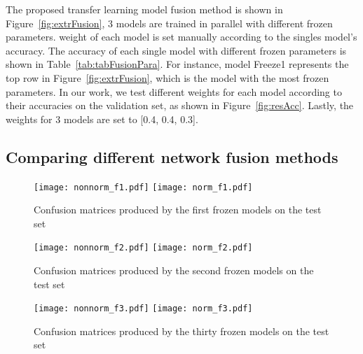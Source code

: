 The proposed transfer learning model 
fusion method is shown in 
Figure~\ref{fig:extrFusion}, 
3 models are trained in parallel with 
different frozen parameters. weight of each 
model is set manually according to the 
singles model’s accuracy. The accuracy of 
each single model with different frozen 
parameters is shown in 
Table~\ref{tab:tabFusionPara}. 
For instance, model Freeze1 represents the 
top row in 
Figure~\ref{fig:extrFusion}, 
which is the model with the most frozen 
parameters. In our work, 
we test different weights for each model 
according to their accuracies on the 
validation set, as shown in 
Figure~\ref{fig:resAcc}. 
Lastly, the weights 
for 3 models are set to [0.4, 0.4, 0.3].

\subsection{Comparing different network fusion 
    methods}
\label{ExpCD}

\begin{figure*}[!ht]
    \centering
    \texttt{[image: nonnorm\_f1.pdf]}
    \texttt{[image: norm\_f1.pdf]}
    \caption{Confusion matrices produced by the 
        first frozen models on the test set}
    \label{fig:resFreeze1}
\end{figure*}   

\begin{figure*}[!ht]
    \centering
    \texttt{[image: nonnorm\_f2.pdf]}
    \texttt{[image: norm\_f2.pdf]}
    \caption{Confusion matrices produced by the 
        second frozen models on the test set}
    \label{fig:resFreeze2}
\end{figure*} 

\begin{figure*}[!ht]
    \centering
    \texttt{[image: nonnorm\_f3.pdf]}
    \texttt{[image: norm\_f3.pdf]}
    \caption{Confusion matrices produced by the 
        thirty frozen models on the test set}
    \label{fig:resFreeze3}
\end{figure*} 

